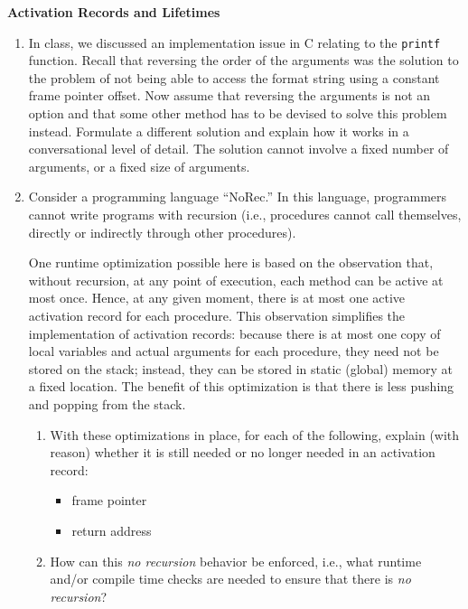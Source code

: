 \documentclass{exam}
\begin{document}
\begin{questions}

\question[25] \textbf{Activation Records and Lifetimes}


\begin{enumerate}
\item 
In class, we discussed an implementation issue in C relating to the \verb|printf| function. Recall that reversing the order of the arguments
was the solution to the problem of not being able to access the format string using a constant frame pointer offset.  
Now assume that reversing the arguments is not an option and that some other method has to be devised to solve this problem instead.  
Formulate a different solution and explain how it works in a conversational level of detail.  The solution cannot involve a fixed
number of arguments, or a fixed size of arguments.

\item Consider a programming language ``NoRec.'' In this language, programmers cannot write programs with recursion (i.e., procedures cannot call themselves, directly
or indirectly through other procedures). 

One runtime optimization possible here is based on the observation that, without recursion, at any point of execution, each method can be active at most once. Hence, at any given moment, there is at most one active activation record for each procedure. This observation simplifies the implementation of activation records: because there is at most one copy of local variables and actual arguments for each procedure, they need not be stored on the stack; instead, they can be stored in static (global) memory at a fixed location. The benefit of this optimization is that there is less pushing and popping from the stack. 
\begin{enumerate}
    \item With these optimizations in place, for each of the following, explain (with reason) whether it is still needed or no longer needed in an activation record:
    \begin{itemize}
        \item frame pointer
        \item return address
    \end{itemize}
    
    \item How can this \emph{no recursion} behavior be enforced, i.e., what runtime and/or compile time checks are needed to ensure that there is \emph{no recursion}?
\end{enumerate}



\end{enumerate}
\end{questions}
\end{document}
